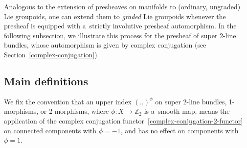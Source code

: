 \documentclass[10pt,a4paper]{amsart}
\numberwithin{equation}{section}
\def\Z {\mathbb{Z}}
\begin{document}
Analogous to the extension of presheaves on manifolds to (ordinary, ungraded) Lie groupoids, one can extend them to \emph{graded} Lie groupoids whenever the presheaf is equipped with a~strictly involutive presheaf automorphism. In the following subsection, we illustrate this process for the presheaf of super 2-line bundles, whose automorphism is given by complex conjugation (see Section~\ref{complex-conjugation}).

\subsection{Main definitions}
\label{graded-equivariant-definitions}

We fix the convention that an upper index $(..)^{\phi}$ on super 2-line bundles, 1-morphisms, or 2-morphisms, where $\phi\colon X \to \Z_2$ is a~smooth map, means the application of the complex conjugation functor~\eqref{complex-conjugation-2-functor} on connected components with $\phi=-1$, and has no effect on components with $\phi=1$.
\end{document}
